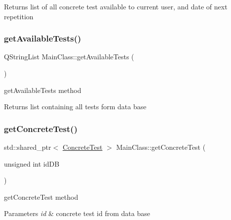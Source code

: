\begin{DoxyReturn}{Returns}
list of all concrete test available to current user, and date of next repetition 
\end{DoxyReturn}
\mbox{\label{class_main_class_a5620620d6b98a1be73a52fb80982fd9e}} 
\subsubsection{\texorpdfstring{get\+Available\+Tests()}{getAvailableTests()}}
{\footnotesize\ttfamily Q\+String\+List Main\+Class\+::get\+Available\+Tests (\begin{DoxyParamCaption}{ }\end{DoxyParamCaption})}



get\+Available\+Tests method 

\begin{DoxyReturn}{Returns}
list containing all tests form data base 
\end{DoxyReturn}
\mbox{\label{class_main_class_aaa60dd5448bb004623189f66335dcc9b}} 
\subsubsection{\texorpdfstring{get\+Concrete\+Test()}{getConcreteTest()}}
{\footnotesize\ttfamily std\+::shared\+\_\+ptr$<$ \hyperlink{class_concrete_test}{Concrete\+Test} $>$ Main\+Class\+::get\+Concrete\+Test (\begin{DoxyParamCaption}\item[{unsigned int}]{id\+DB }\end{DoxyParamCaption})}



get\+Concrete\+Test method 


\begin{DoxyParams}{Parameters}
{\em id} & concrete test id from data base \\
\hline
\end{DoxyParams}
\mbox{\label{class_main_class_ab17ab8eec8bbfadae4c5eda7cc4421cf}} 
